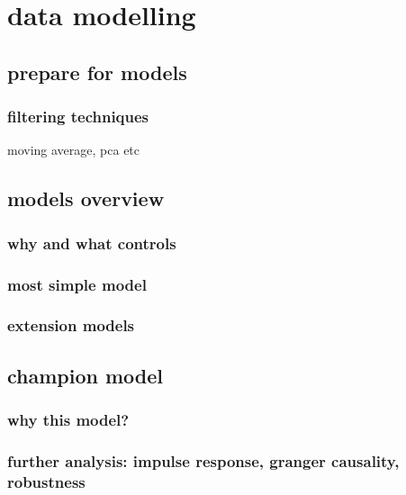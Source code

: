 \chapter{data modelling}\label{sec3}
\thispagestyle{empty}

\section{prepare for models}

\subsection{filtering techniques}

moving average, pca etc

\section{models overview}

\subsection{why and what controls}

\subsection{most simple model}

\subsection{extension models}

\section{champion model}

\subsection{why this model?}

\subsection{further analysis: impulse response, granger causality, robustness}

\cleardoublepage
